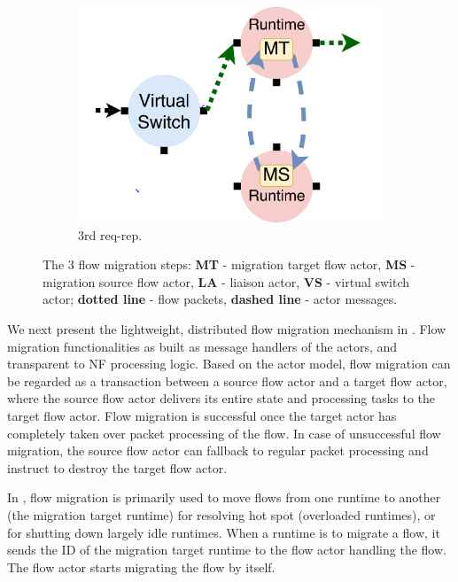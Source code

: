 \begin{figure}[!t]
\begin{subfigure}[t]{0.33\linewidth}
 \centering
   \includegraphics[width=\columnwidth]{figure/nfactor-mig3.pdf}
   \caption{3rd req-rep.}\label{fig:mig3} \end{subfigure}\hfill
 \caption{The 3 flow migration steps: \textbf{MT} - migration target flow actor, \textbf{MS} - migration source flow actor, \textbf{LA} - liaison actor, \textbf{VS} - virtual switch actor; \textbf{dotted line} - flow packets, \textbf{dashed line} - actor messages.}
\label{fig:mig}
\end{figure}

We next present the lightweight, distributed flow migration mechanism in \nfactor. Flow migration functionalities as built as message handlers of the actors, and transparent to NF processing logic. Based on the actor model, flow migration can be regarded as a transaction between a source flow actor and a target flow actor, where the source flow actor delivers its entire state and processing tasks to the target flow actor. Flow migration is successful once the target actor has completely taken over packet processing of the flow. %
 In case of unsuccessful flow migration, the source flow actor can fallback to regular packet processing and instruct to destroy the target flow actor.
 
In \nfactor, flow migration is primarily used to move flows from one runtime to another (the migration target runtime) for resolving hot spot (overloaded runtimes), or for shutting down largely idle runtimes.  When a runtime is to migrate a flow,  %
 it sends the ID of the migration target runtime to the flow actor handling the flow. The flow actor starts migrating the flow by itself. %
 

